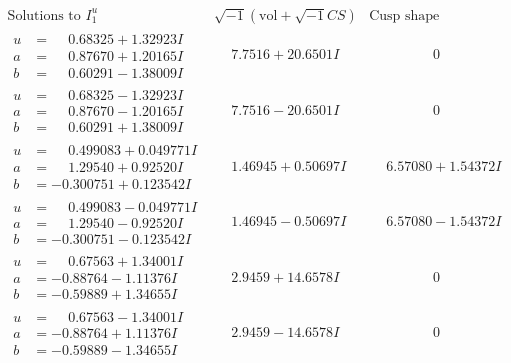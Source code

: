 \documentclass[1p]{elsarticle_modified}
\theoremstyle{definition}
\newcommand{\I}{\sqrt{-1}}
\begin{document}
$$\begin{array}{c|c|c}
 \end{array}$$\newpage$$\begin{array}{c|c|c}  
\text{Solutions to }I^u_{1}& \I (\text{vol} + \sqrt{-1}CS) & \text{Cusp shape}\\
 \hline 
\begin{aligned}
u &= \phantom{-}0.68325 + 1.32923 I \\
a &= \phantom{-}0.87670 + 1.20165 I \\
b &= \phantom{-}0.60291 - 1.38009 I\end{aligned}
 & \phantom{-}7.7516 + 20.6501 I & \phantom{-0.000000 } 0 \\ \hline\begin{aligned}
u &= \phantom{-}0.68325 - 1.32923 I \\
a &= \phantom{-}0.87670 - 1.20165 I \\
b &= \phantom{-}0.60291 + 1.38009 I\end{aligned}
 & \phantom{-}7.7516 - 20.6501 I & \phantom{-0.000000 } 0 \\ \hline\begin{aligned}
u &= \phantom{-}0.499083 + 0.049771 I \\
a &= \phantom{-}1.29540 + 0.92520 I \\
b &= -0.300751 + 0.123542 I\end{aligned}
 & \phantom{-}1.46945 + 0.50697 I & \phantom{-}6.57080 + 1.54372 I \\ \hline\begin{aligned}
u &= \phantom{-}0.499083 - 0.049771 I \\
a &= \phantom{-}1.29540 - 0.92520 I \\
b &= -0.300751 - 0.123542 I\end{aligned}
 & \phantom{-}1.46945 - 0.50697 I & \phantom{-}6.57080 - 1.54372 I \\ \hline\begin{aligned}
u &= \phantom{-}0.67563 + 1.34001 I \\
a &= -0.88764 - 1.11376 I \\
b &= -0.59889 + 1.34655 I\end{aligned}
 & \phantom{-}2.9459 + 14.6578 I & \phantom{-0.000000 } 0 \\ \hline\begin{aligned}
u &= \phantom{-}0.67563 - 1.34001 I \\
a &= -0.88764 + 1.11376 I \\
b &= -0.59889 - 1.34655 I\end{aligned}
 & \phantom{-}2.9459 - 14.6578 I & \phantom{-0.000000 } 0 \\ \hline\begin{aligned}

\end{aligned}
\end{array}$$
\end{document}
